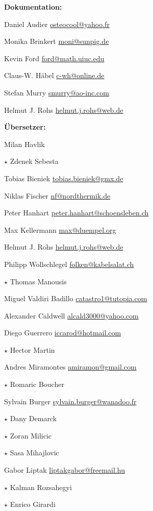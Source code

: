 \vspace{1em}
{\large\bf Dokumentation:}
\begin{compactitem}
\item Daniel Audier \url{osteocool@yahoo.fr}
\item Monika Brinkert \url{moni@sunpig.de}
\item Kevin Ford \url{ford@math.uiuc.edu}
\item Claus-W. Häbel \url{c-wh@online.de}
\item Stefan Murry \url{smurry@ao-inc.com}
\item Helmut J. Rohs \url{helmut.j.rohs@web.de} 
\end{compactitem}

\vspace{1em}
{\large\bf Übersetzer:}
\begin{compactitem}
\item Milan Havlik
\item$\star$  Zdenek Sebesta
\item Tobias Bieniek \url{tobias.bieniek@gmx.de}
\item Niklas Fischer \url{nf@nordthermik.de}
\item Peter Hanhart \url{peter.hanhart@schoensleben.ch}
\item Max Kellermann \url{max@duempel.org}
\item Helmut J. Rohs \url{helmut.j.rohs@web.de}
\item Philipp Wollschlegel \url{folken@kabelsalat.ch}
\item$\star$  Thomas Manousis
\item Miguel Valdiri Badillo \url{catastro1@tutopia.com}
\item Alexander Caldwell \url{alcald3000@yahoo.com}
\item Diego Guerrero \url{iccarod@hotmail.com}
\item$\star$  Hector Martin
\item Andres Miramontes \url{amiramon@gmail.com}
\item$\star$  Romaric Boucher
\item Sylvain Burger \url{sylvain.burger@wanadoo.fr}
\item$\star$  Dany Demarck
\item$\star$  Zoran Milicic
\item$\star$  Sasa Mihajlovic
\item Gabor Liptak \url{liptakgabor@freemail.hu}
\item$\star$  Kalman Rozsahegyi
\item$\star$  Enrico Girardi

\end{compactitem}
